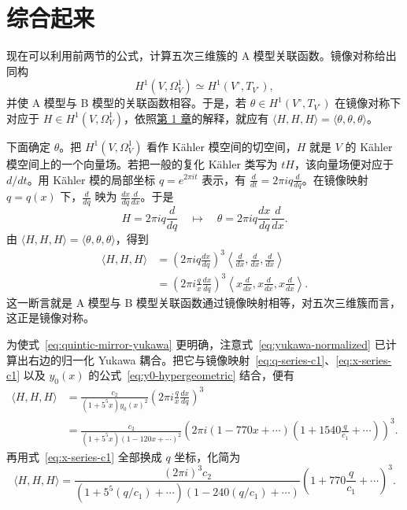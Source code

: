 \section{综合起来}\label{sec:quintic-assemble}

现在可以利用前两节的公式，计算五次三维簇的 A 模型关联函数。镜像对称给出同构
\[
H^1(V,\Omega_V^1)\simeq H^1(V^\circ,T_{V^\circ}),
\]
并使 A 模型与 B 模型的关联函数相容。于是，若 $\theta\in H^1(V^\circ,T_{V^\circ})$ 在镜像对称下对应于 $H\in H^1(V,\Omega_V^1)$，依照\hyperref[chap:introduction]{第 1 章}的解释，就应有 $\langle H,H,H\rangle=\langle\theta,\theta,\theta\rangle$。

下面确定 $\theta$。把 $H^1(V,\Omega_V^1)$ 看作 Kähler 模空间的切空间，$H$ 就是 $V$ 的 Kähler 模空间上的一个向量场。若把一般的复化 Kähler 类写为 $tH$，该向量场便对应于 $d/dt$。用 Kähler 模的局部坐标 $q=e^{2\pi it}$ 表示，有 $\frac d{dt}=2\pi iq\frac d{dq}$。在镜像映射 $q=q(x)$ 下，$\frac d{dq}$ 映为 $\frac{dx}{dq}\frac d{dx}$。于是
\[
H=2\pi iq\frac d{dq}\quad\longmapsto\quad
\theta=2\pi iq\frac{dx}{dq}\frac d{dx}.
\]
由 $\langle H,H,H\rangle=\langle\theta,\theta,\theta\rangle$，得到
\begin{equation}\label{eq:quintic-mirror-yukawa}
\begin{aligned}
\langle H,H,H\rangle
&=\left(2\pi iq\frac{dx}{dq}\right)^3
  \left\langle\frac d{dx},\frac d{dx},\frac d{dx}\right\rangle\\
&=\left(2\pi i\frac qx\frac{dx}{dq}\right)^3
  \left\langle x\frac d{dx},x\frac d{dx},x\frac d{dx}\right\rangle.
\end{aligned}
\end{equation}
这一断言就是 A 模型与 B 模型关联函数通过镜像映射相等，对五次三维簇而言，这正是镜像对称。

为使式~\eqref{eq:quintic-mirror-yukawa} 更明确，注意式~\eqref{eq:yukawa-normalized} 已计算出右边的归一化 Yukawa 耦合。把它与镜像映射~\eqref{eq:q-series-c1}、\eqref{eq:x-series-c1} 以及 $y_0(x)$ 的公式~\eqref{eq:y0-hypergeometric} 结合，便有
\[
\begin{aligned}
\langle H,H,H\rangle
&=\frac{c_2}{(1+5^5x)y_0(x)^2}
  \left(2\pi i\frac qx\frac{dx}{dq}\right)^3\\
&=\frac{c_2}{(1+5^5x)(1-120x+\cdots)^2}
 \left(2\pi i(1-770x+\cdots)
 \left(1+1540\frac q{c_1}+\cdots\right)\right)^3.
\end{aligned}
\]
再用式~\eqref{eq:x-series-c1} 全部换成 $q$ 坐标，化简为
\begin{equation}\label{eq:quintic-c-series}
\langle H,H,H\rangle
=\frac{(2\pi i)^3c_2}{
 (1+5^5(q/c_1)+\cdots)(1-240(q/c_1)+\cdots)}
 \left(1+770\frac q{c_1}+\cdots\right)^3.
\end{equation}


